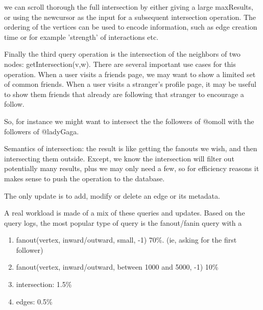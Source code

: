 \documentclass[11pt]{article}
\begin{document}

 we can scroll thorough the full intersection by either giving a large maxResults, or using the newcursor as the input for a subsequent intersection operation. The ordering of the vertices can be used to encode information, such as edge creation time or for example 'strength' of interactions etc.


Finally the third query operation is the intersection of the neighbors of two nodes: getIntersection(v,w).
There are several important use cases for this operation. When a user visits a friends page, we may want to show a limited set of common friends.  When a user visits a stranger's profile page, it may be useful to show them friends that already are following that stranger to encourage a follow.



So, for instance we might want to intersect the the followers of @omoll with the followers of @ladyGaga.

Semantics of intersection: the result is like getting the fanouts we wish, and then intersecting them outside. Except, we know the intersection will filter out potentially many results, plus we may only need a few, so for efficiency reasons it makes sense to push the operation to the database.

The only update is to add, modify or delete an edge or its metadata. 


A real workload is made of a mix of these queries and updates. Based on the query logs, the most popular type of query is the fanout/fanin query with a 

\begin{enumerate}
\item fanout(vertex, inward/outward, small, -1)  70\%. (ie, asking for the first follower)
\item fanout(vertex, inward/outward, between 1000 and 5000, -1) 10\%
\item intersection: 1.5\%
\item edges: 0.5\%
\end{enumerate}
\end{document}

